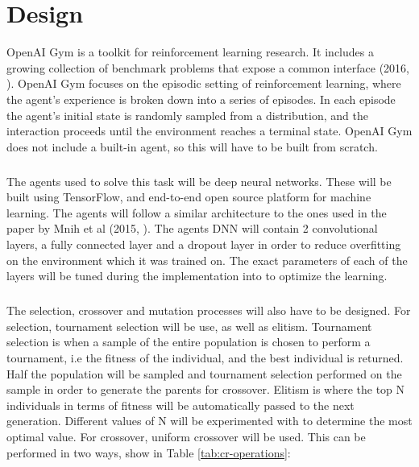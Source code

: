 \chapter{Design}

OpenAI Gym is a toolkit for reinforcement learning research. It includes a growing collection of benchmark problems that expose a common interface (2016, \cite{gym}). OpenAI Gym focuses on the episodic setting of reinforcement learning, where the agent's experience is broken down into a series of episodes. In each episode the agent's initial state is randomly sampled from a distribution, and the interaction proceeds until the environment reaches a terminal state. OpenAI Gym does not include a built-in agent, so this will have to be built from scratch.

\paragraph{}

The agents used to solve this task will be deep neural networks. These will be built using TensorFlow, and end-to-end open source platform for machine learning. The agents will follow a similar architecture to the ones used in the paper by Mnih et al (2015, \cite{mnih}). The agents DNN will contain 2 convolutional layers, a fully connected layer and a dropout layer in order to reduce overfitting on the environment which it was trained on. The exact parameters of each of the layers will be tuned during the implementation into to optimize the learning.

\paragraph{}

The selection, crossover and mutation processes will also have to be designed. For selection, tournament selection will be use, as well as elitism. Tournament selection is when a sample of the entire population is chosen to perform a tournament, i.e the fitness of the individual, and the best individual is returned. Half the population will be sampled and tournament selection performed on the sample in order to generate the parents for crossover. Elitism is where the top N individuals in terms of fitness will be automatically passed to the next generation. Different values of N will be experimented with to determine the most optimal value. For crossover, uniform crossover will be used. This can be performed in two ways, show in Table \ref{tab:cr-operations}:

